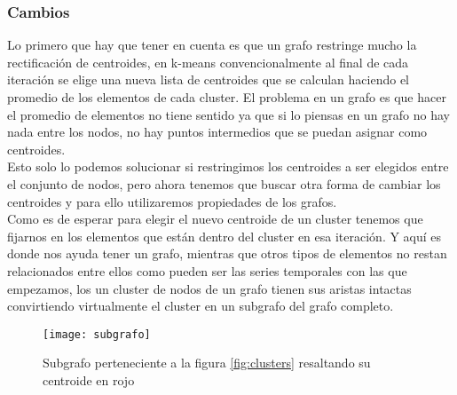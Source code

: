 \documentclass[12pt,a4paper]{article}
\begin{document}
			\subsubsection{Cambios}
			Lo primero que hay que tener en cuenta es que un grafo restringe mucho la rectificación de centroides, en k-means convencionalmente al final de cada iteración se elige una nueva lista de centroides que se calculan haciendo el promedio de los elementos de cada cluster. El problema en un grafo es que hacer el promedio de elementos no tiene sentido ya que si lo piensas en un grafo no hay nada entre los nodos, no hay puntos intermedios que se puedan asignar como centroides.\\
			Esto solo lo podemos solucionar si restringimos los centroides a ser elegidos entre el conjunto de nodos, pero ahora tenemos que buscar otra forma de cambiar los centroides y para ello utilizaremos propiedades de los grafos.\\
			Como es de esperar para elegir el nuevo centroide de un cluster tenemos que fijarnos en los elementos que están dentro del cluster en esa iteración. Y aquí es donde nos ayuda tener un grafo, mientras que otros tipos de elementos no restan relacionados entre ellos como pueden ser las series temporales con las que empezamos, los un cluster de nodos de un grafo tienen sus aristas intactas convirtiendo virtualmente el cluster en un subgrafo del grafo completo.\\
			 \begin{figure}[H]
\centering
  \centering
  \texttt{[image: subgrafo]}
\caption{Subgrafo perteneciente  a la figura \ref{fig:clusters} resaltando su centroide en rojo }
\label{fig:subrgrafo}
\end{figure}
			
\end{document}
